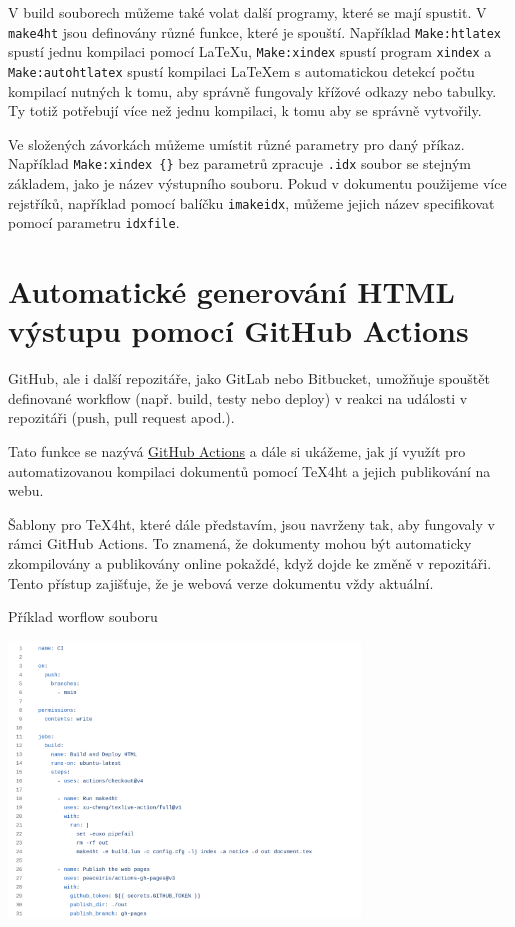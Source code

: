 V build souborech můžeme také volat další programy, které se mají spustit. V \texttt{make4ht}
jsou definovány různé funkce, které je spouští. Například \texttt{Make:htlatex} spustí
jednu kompilaci pomocí \LaTeX u, \texttt{Make:xindex} spustí program \texttt{xindex}
a \texttt{Make:autohtlatex} spustí kompilaci \LaTeX em s automatickou detekcí počtu kompilací
nutných k tomu, aby správně fungovaly křížové odkazy nebo tabulky. Ty totiž potřebují více než jednu kompilaci, k tomu
aby se správně vytvořily.

Ve složených závorkách můžeme umístit různé parametry pro daný příkaz. Například 
\verb|Make:xindex {}| bez parametrů zpracuje \texttt{.idx} soubor se stejným základem,
jako je název výstupního souboru. Pokud v dokumentu použijeme více rejstříků, 
například pomocí balíčku \texttt{imakeidx}, můžeme jejich název specifikovat pomocí
parametru \texttt{idxfile}.




\section{Automatické generování HTML výstupu pomocí GitHub Actions}
GitHub, ale i další repozitáře, jako GitLab nebo Bitbucket,  umožňuje
spouštět definované workflow (např. build, testy nebo deploy) v reakci na
události v repozitáři (push, pull request apod.).

Tato funkce se nazývá \href{https://docs.github.com/en/actions/writing-workflows/quickstart}{GitHub Actions} a dále si ukážeme, jak jí využít pro automatizovanou
kompilaci dokumentů pomocí \TeX4ht a jejich publikování na webu.

Šablony pro \TeX4ht, které dále představím, jsou navrženy tak, aby fungovaly v rámci GitHub Actions. To
znamená, že dokumenty mohou být automaticky zkompilovány a publikovány online
pokaždé, když dojde ke změně v repozitáři. Tento přístup zajišťuje, že je
webová verze dokumentu vždy aktuální.


\begin{frame}[fragile]{Příklad worflow souboru}

  \includegraphics[width=0.7\textwidth]{img/workflow.png}

\end{frame}

